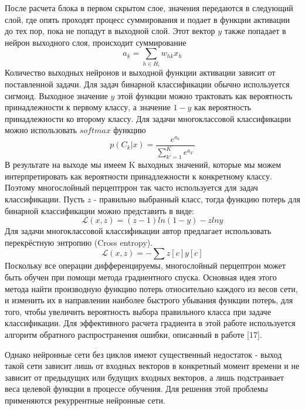     После расчета блока в первом скрытом слое, значения передаются в следующий слой, где опять проходят процесс суммирования и подает в функции активации до тех пор, пока не попадут в выходной слой. Этот вектор $y$ также попадает в нейрон выходного слоя, происходит суммирование
    \begin{equation}
    a_{k}=\sum_{h\in  H_{i}}w_{hk}x_{h}
    \end{equation}
    Количество выходных нейронов и выходной функции активации зависит от поставленной задачи. Для задач бинарной классификации обычно используется сигмоид. Выходное значение $y$ этой функции можно трактовать как вероятность принадлежности к первому классу, а значение $1-y$ как вероятность принадлежности ко второму классу.
    Для задачи многоклассовой классификации можно использовать $softmax$ функцию
    \begin{equation}
    p(C_{k}|x)=\frac{e^{a_{k}}}{\sum_{k{}'=1}^{K}e^{a_{k{}'}}}
    \end{equation}
    В результате на выходе мы имеем K выходных значений, которые мы можем интерпретировать как вероятности принадлежности к конкретному классу. Поэтому многослойный перцептррон так часто используется для задач классификации. Пусть $z$ - правильно выбранный класс, тогда функцию потерь для бинарной классификации можно представить в виде:
    \begin{equation}
    \mathcal{L}(x,z) = (z-1)ln(1-y)-zlny
    \end{equation}
    Для задачи многоклассовой классификации автор предлагает использовать перекрёстную энтропию (Cross entropy). 
    \begin{equation}
    \mathcal{L}(x,z) = -\sum{z[c] y[c]}
    \end{equation}
    Поскольку все операции дифференцируемы, многослойный перцептрон может быть обучен при помощи метода градиентного спуска. Основная идея этого метода найти производную функцию потерь относительно каждого из весов сети, и изменить их в направлении наиболее быстрого убывания функции потерь, для того, чтобы увеличить вероятность выбора правильного класса при задаче классификации. 
    Для эффективного расчета градиента в этой работе используется алгоритм обратного распространения ошибки, описанный в работе [17]. 

    Однако нейронные сети без циклов имеют существенный недостаток - выход такой сети зависит лишь от входных векторов в конкретный момент времени и не зависит от предыдущих или будущих входных векторов, а лишь подстраивает веса целевой функции в процессе обучения. Для решения этой проблемы применяются рекуррентные нейронные сети.

